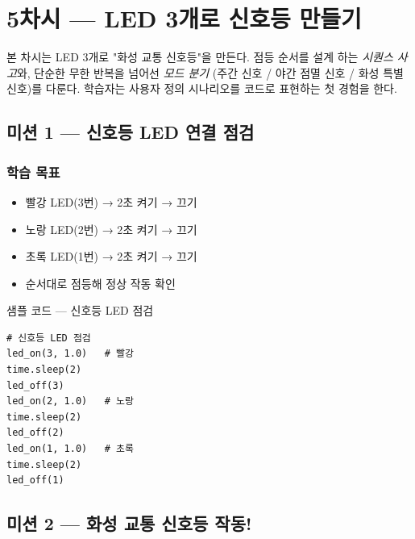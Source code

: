 \section{5차시 --- LED 3개로 신호등 만들기}
\label{sec:ch05}

본 차시는 LED 3개로 "화성 교통 신호등"을 만든다. 점등 순서를 설계
하는 \emph{시퀀스 사고}와, 단순한 무한 반복을 넘어선 \emph{모드 분기}
(주간 신호 / 야간 점멸 신호 / 화성 특별 신호)를 다룬다. 학습자는 사용자
정의 시나리오를 코드로 표현하는 첫 경험을 한다.

\subsection{미션 1 --- 신호등 LED 연결 점검}
\label{subsec:ch05-m1}

\begin{storybox}
\end{storybox}

\subsubsection*{학습 목표}
\begin{itemize}[leftmargin=1.4em]
  \item 빨강 LED(3번) → 2초 켜기 → 끄기
  \item 노랑 LED(2번) → 2초 켜기 → 끄기
  \item 초록 LED(1번) → 2초 켜기 → 끄기
  \item 순서대로 점등해 정상 작동 확인
\end{itemize}

\begin{labbox}{샘플 코드 --- 신호등 LED 점검}
\begin{verbatim}
# 신호등 LED 점검
led_on(3, 1.0)   # 빨강
time.sleep(2)
led_off(3)
led_on(2, 1.0)   # 노랑
time.sleep(2)
led_off(2)
led_on(1, 1.0)   # 초록
time.sleep(2)
led_off(1)
\end{verbatim}
\end{labbox}

\subsection{미션 2 --- 화성 교통 신호등 작동!}
\label{subsec:ch05-m2}

